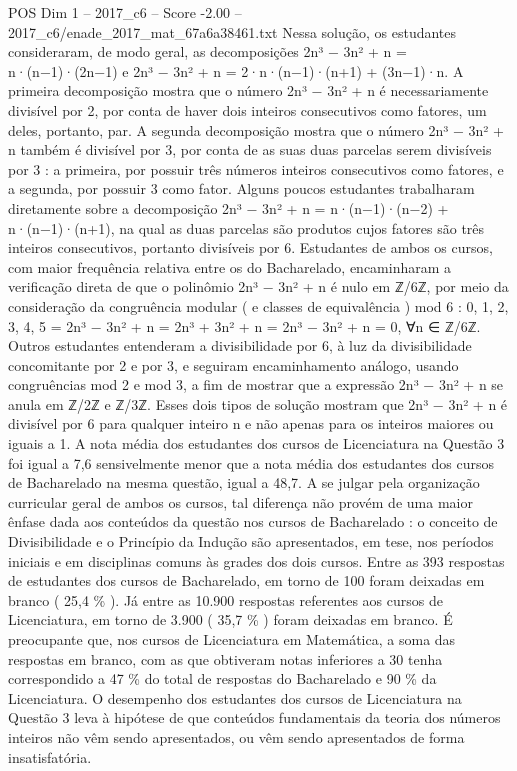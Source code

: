 \begin{textsample}{POS Dim 1 – 2017\_c6 – Score -2.00 – 2017\_c6/enade\_2017\_mat\_67a6a38461.txt}
Nessa solução, os estudantes consideraram, de modo geral, as decomposições 2n³ − 3n² + n = n·(n−1)·(2n−1) e 2n³ − 3n² + n = 2·n·(n−1)·(n+1) + (3n−1)·n.
A primeira decomposição mostra que o número 2n³ − 3n² + n é necessariamente divisível por 2, por conta de haver dois inteiros consecutivos como fatores, um deles, portanto, par.
A segunda decomposição mostra que o número 2n³ − 3n² + n também é divisível por 3, por conta de as suas duas parcelas serem divisíveis por 3 : a primeira, por possuir três números inteiros consecutivos como fatores, e a segunda, por possuir 3 como fator.
Alguns poucos estudantes trabalharam diretamente sobre a decomposição 2n³ − 3n² + n = n·(n−1)·(n−2) + n·(n−1)·(n+1), na qual as duas parcelas são produtos cujos fatores são três inteiros consecutivos, portanto divisíveis por 6.
Estudantes de ambos os cursos, com maior frequência relativa entre os do Bacharelado, encaminharam a verificação direta de que o polinômio 2n³ − 3n² + n é nulo em ℤ/6ℤ, por meio da consideração da congruência modular ( e classes de equivalência ) mod 6 : 0, 1, 2, 3, 4, 5 = 2n³ − 3n² + n = 2n³ + 3n² + n = 2n³ − 3n² + n = 0, ∀n ∈ ℤ/6ℤ.
Outros estudantes entenderam a divisibilidade por 6, à luz da divisibilidade concomitante por 2 e por 3, e seguiram encaminhamento análogo, usando congruências mod 2 e mod 3, a fim de mostrar que a expressão 2n³ − 3n² + n se anula em ℤ/2ℤ e ℤ/3ℤ.
Esses dois tipos de solução mostram que 2n³ − 3n² + n é divisível por 6 para qualquer inteiro n e não apenas para os inteiros maiores ou iguais a 1.
A nota média dos estudantes dos cursos de Licenciatura na Questão 3 foi igual a 7,6 sensivelmente menor que a nota média dos estudantes dos cursos de Bacharelado na mesma questão, igual a 48,7.
A se julgar pela organização curricular geral de ambos os cursos, tal diferença não provém de uma maior ênfase dada aos conteúdos da questão nos cursos de Bacharelado : o conceito de Divisibilidade e o Princípio da Indução são apresentados, em tese, nos períodos iniciais e em disciplinas comuns às grades dos dois cursos.
Entre as 393 respostas de estudantes dos cursos de Bacharelado, em torno de 100 foram deixadas em branco ( 25,4 \% ).
Já entre as 10.900 respostas referentes aos cursos de Licenciatura, em torno de 3.900 ( 35,7 \% ) foram deixadas em branco.
É preocupante que, nos cursos de Licenciatura em Matemática, a soma das respostas em branco, com as que obtiveram notas inferiores a 30 tenha correspondido a 47 \% do total de respostas do Bacharelado e 90 \% da Licenciatura.
O desempenho dos estudantes dos cursos de Licenciatura na Questão 3 leva à hipótese de que conteúdos fundamentais da teoria dos números inteiros não vêm sendo apresentados, ou vêm sendo apresentados de forma insatisfatória.

\end{textsample}
